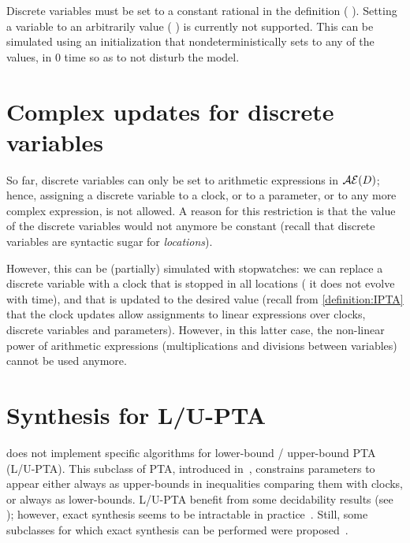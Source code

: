 Discrete variables must be set to a constant rational in the  definition (\eg{} ).
Setting a variable to an arbitrarily value (\eg{} ) is currently not supported.
This can be simulated using an initialization \IPTA{} that nondeterministically sets  to any of the values, in 0 time so as to not disturb the model.


\section{Complex updates for discrete variables}

So far, discrete variables can only be set to arithmetic expressions in $\mathcal{AE}(D)$;
hence, assigning a discrete variable to a clock, or to a parameter, or to any more complex expression, is not allowed.
A reason for this restriction is that the value of the discrete variables would not anymore be constant (recall that discrete variables are syntactic sugar for \emph{locations}).

However, this can be (partially) simulated with stopwatches: we can replace a discrete variable with a clock that is stopped in all locations (\ie{} it does not evolve with time), and that is updated to the desired value (recall from \cref{definition:IPTA} that the clock updates allow assignments to linear expressions over clocks, discrete variables and parameters).
However, in this latter case, the non-linear power of arithmetic expressions (multiplications and divisions between variables) cannot be used anymore.



\section{Synthesis for L/U-PTA}

\imitator{} does not implement specific algorithms for lower-bound / upper-bound PTA (L/U-PTA).
This subclass of PTA, introduced in~\cite{HRSV02}, constrains parameters to appear either always as upper-bounds in inequalities comparing them with clocks, or always as lower-bounds.
L/U-PTA benefit from some decidability results (see \eg{} \cite{HRSV02,BlT09,JLR15,AM15,ALime17}); however, exact synthesis seems to be intractable in practice~\cite{JLR15,ALR16ICFEM}.
Still, some subclasses for which exact synthesis can be performed were proposed~\cite{BlT09,ALR18FORMATS}.

